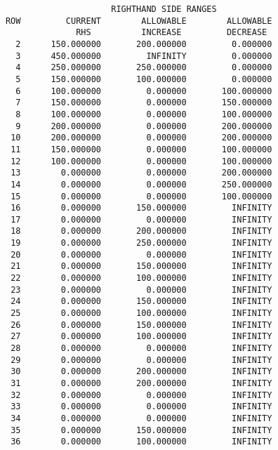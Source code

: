 \documentclass[12pt]{report}
\begin{document}
\begin{verbatim}
                           RIGHTHAND SIDE RANGES
      ROW         CURRENT        ALLOWABLE        ALLOWABLE
                    RHS          INCREASE         DECREASE
        2      150.000000       200.000000         0.000000
        3      450.000000         INFINITY         0.000000
        4      250.000000       250.000000         0.000000
        5      150.000000       100.000000         0.000000
        6      100.000000         0.000000       100.000000
        7      150.000000         0.000000       150.000000
        8      100.000000         0.000000       100.000000
        9      200.000000         0.000000       200.000000
       10      200.000000         0.000000       200.000000
       11      150.000000         0.000000       100.000000
       12      100.000000         0.000000       100.000000
       13        0.000000         0.000000       200.000000
       14        0.000000         0.000000       250.000000
       15        0.000000         0.000000       100.000000
       16        0.000000       150.000000         INFINITY
       17        0.000000         0.000000         INFINITY
       18        0.000000       200.000000         INFINITY
       19        0.000000       250.000000         INFINITY
       20        0.000000         0.000000         INFINITY
       21        0.000000       150.000000         INFINITY
       22        0.000000       100.000000         INFINITY
       23        0.000000         0.000000         INFINITY
       24        0.000000       150.000000         INFINITY
       25        0.000000       100.000000         INFINITY
       26        0.000000       150.000000         INFINITY
       27        0.000000       100.000000         INFINITY
       28        0.000000         0.000000         INFINITY
       29        0.000000         0.000000         INFINITY
       30        0.000000       200.000000         INFINITY
       31        0.000000       200.000000         INFINITY
       32        0.000000         0.000000         INFINITY
       33        0.000000         0.000000         INFINITY
       34        0.000000         0.000000         INFINITY
       35        0.000000       150.000000         INFINITY
       36        0.000000       100.000000         INFINITY

\end{verbatim}
\end{document}
